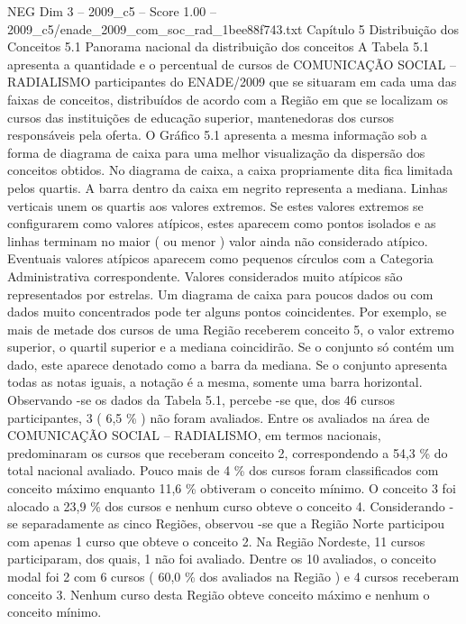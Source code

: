 \begin{textsample}{NEG Dim 3 – 2009\_c5 – Score 1.00 – 2009\_c5/enade\_2009\_com\_soc\_rad\_1bee88f743.txt}  \label{ex:f3_neg_107}
Capítulo 5 Distribuição dos Conceitos 5.1 Panorama nacional da distribuição dos conceitos A Tabela 5.1 apresenta a quantidade e o percentual de cursos de COMUNICAÇÃO SOCIAL – RADIALISMO participantes do ENADE/2009 que se situaram em cada uma das faixas de conceitos, distribuídos de acordo com a Região em que se localizam os cursos das instituições de educação superior, mantenedoras dos cursos responsáveis pela oferta.
O Gráfico 5.1 apresenta a mesma informação sob a forma de diagrama de caixa para uma melhor visualização da dispersão dos conceitos obtidos.
No diagrama de caixa, a caixa propriamente dita fica limitada pelos quartis.
A barra dentro da caixa em negrito representa a mediana.
Linhas verticais unem os quartis aos valores extremos.
Se estes valores extremos se configurarem como valores atípicos, estes aparecem como pontos isolados e as linhas terminam no maior ( ou menor ) valor ainda não considerado atípico.
Eventuais valores atípicos aparecem como pequenos círculos com a Categoria Administrativa correspondente.
Valores considerados muito atípicos são representados por estrelas.
Um diagrama de caixa para poucos dados ou com dados muito concentrados pode ter alguns pontos coincidentes.
Por exemplo, se mais de metade dos cursos de uma Região receberem conceito 5, o valor extremo superior, o quartil superior e a mediana coincidirão.
Se o conjunto só contém um dado, este aparece denotado como a barra da mediana.
Se o conjunto apresenta todas as notas iguais, a notação é a mesma, somente uma barra horizontal.
Observando -se os dados da Tabela 5.1, percebe -se que, dos 46 cursos participantes, 3 ( 6,5 \% ) não foram avaliados.
Entre os avaliados na área de COMUNICAÇÃO SOCIAL – RADIALISMO, em termos nacionais, predominaram os cursos que receberam conceito 2, correspondendo a 54,3 \% do total nacional avaliado.
Pouco mais de 4 \% dos cursos foram classificados com conceito máximo enquanto 11,6 \% obtiveram o conceito mínimo.
O conceito 3 foi alocado a 23,9 \% dos cursos e nenhum curso obteve o conceito 4.
Considerando -se separadamente as cinco Regiões, observou -se que a Região Norte participou com apenas 1 curso que obteve o conceito 2.
Na Região Nordeste, 11 cursos participaram, dos quais, 1 não foi avaliado.
Dentre os 10 avaliados, o conceito modal foi 2 com 6 cursos ( 60,0 \% dos avaliados na Região ) e 4 cursos receberam conceito 3.
Nenhum curso desta Região obteve conceito máximo e nenhum o conceito mínimo.

\end{textsample}
